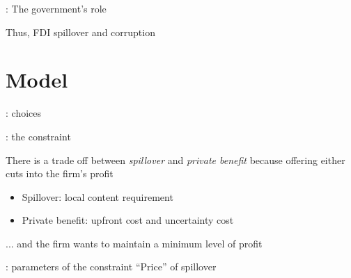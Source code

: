 \documentclass[14pt]{beamer}
\begin{document}
\begin{frame}{\secname: The government's role}



\end{frame}

\begin{frame}{\secname}
Thus, FDI spillover and corruption
\end{frame}

\section{Model}

\begin{frame}{\secname: choices}

\end{frame}

\begin{frame}{\secname: the constraint}

There is a trade off between \textit{spillover} and \textit{private benefit} because offering either cuts into the firm's profit
\begin{itemize}
\item<2-> Spillover: local content requirement
\item<3-> Private benefit: upfront cost and uncertainty cost 
\end{itemize}

... and the firm wants to maintain a minimum level of profit

\end{frame}

\begin{frame}{\secname: parameters of the constraint}
 ``Price'' of spillover

\end{frame}
\end{document}
